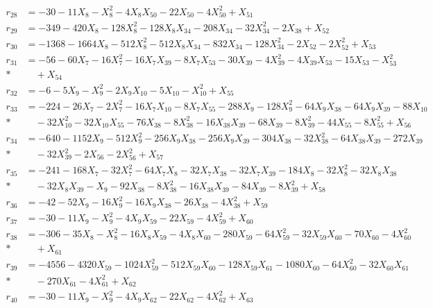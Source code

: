 \begin{align*}
r_{28} &= -30 - 11X_{8} - X_{8}^{2} - 4X_{8}X_{50} - 22X_{50} - 4X_{50}^{2} + X_{51} \\[3pt]
r_{29} &= -349 - 420X_{8} - 128X_{8}^{2} - 128X_{8}X_{34} - 208X_{34} - 32X_{34}^{2} - 2X_{38} + X_{52} \\[3pt]
r_{30} &= -1368 - 1664X_{8} - 512X_{8}^{2} - 512X_{8}X_{34} - 832X_{34} - 128X_{34}^{2} - 2X_{52} - 2X_{52}^{2} + X_{53} \\[3pt]
r_{31} &= -56 - 60X_{7} - 16X_{7}^{2} - 16X_{7}X_{39} - 8X_{7}X_{53} - 30X_{39} - 4X_{39}^{2} - 4X_{39}X_{53} - 15X_{53} - X_{53}^{2} \\*
&\quad  + X_{54} \\[3pt]
r_{32} &= -6 - 5X_{9} - X_{9}^{2} - 2X_{9}X_{10} - 5X_{10} - X_{10}^{2} + X_{55} \\[3pt]
r_{33} &= -224 - 26X_{7} - 2X_{7}^{2} - 16X_{7}X_{10} - 8X_{7}X_{55} - 288X_{9} - 128X_{9}^{2} - 64X_{9}X_{38} - 64X_{9}X_{39} - 88X_{10} \\*
&\quad  - 32X_{10}^{2} - 32X_{10}X_{55} - 76X_{38} - 8X_{38}^{2} - 16X_{38}X_{39} - 68X_{39} - 8X_{39}^{2} - 44X_{55} - 8X_{55}^{2} + X_{56} \\[3pt]
r_{34} &= -640 - 1152X_{9} - 512X_{9}^{2} - 256X_{9}X_{38} - 256X_{9}X_{39} - 304X_{38} - 32X_{38}^{2} - 64X_{38}X_{39} - 272X_{39} \\*
&\quad  - 32X_{39}^{2} - 2X_{56} - 2X_{56}^{2} + X_{57} \\[3pt]
r_{35} &= -241 - 168X_{7} - 32X_{7}^{2} - 64X_{7}X_{8} - 32X_{7}X_{38} - 32X_{7}X_{39} - 184X_{8} - 32X_{8}^{2} - 32X_{8}X_{38} \\*
&\quad  - 32X_{8}X_{39} - X_{9} - 92X_{38} - 8X_{38}^{2} - 16X_{38}X_{39} - 84X_{39} - 8X_{39}^{2} + X_{58} \\[3pt]
r_{36} &= -42 - 52X_{9} - 16X_{9}^{2} - 16X_{9}X_{38} - 26X_{38} - 4X_{38}^{2} + X_{59} \\[3pt]
r_{37} &= -30 - 11X_{9} - X_{9}^{2} - 4X_{9}X_{59} - 22X_{59} - 4X_{59}^{2} + X_{60} \\[3pt]
r_{38} &= -306 - 35X_{8} - X_{8}^{2} - 16X_{8}X_{59} - 4X_{8}X_{60} - 280X_{59} - 64X_{59}^{2} - 32X_{59}X_{60} - 70X_{60} - 4X_{60}^{2} \\*
&\quad  + X_{61} \\[3pt]
r_{39} &= -4556 - 4320X_{59} - 1024X_{59}^{2} - 512X_{59}X_{60} - 128X_{59}X_{61} - 1080X_{60} - 64X_{60}^{2} - 32X_{60}X_{61} \\*
&\quad  - 270X_{61} - 4X_{61}^{2} + X_{62} \\[3pt]
r_{40} &= -30 - 11X_{9} - X_{9}^{2} - 4X_{9}X_{62} - 22X_{62} - 4X_{62}^{2} + X_{63} \\[3pt]

\end{align*}
